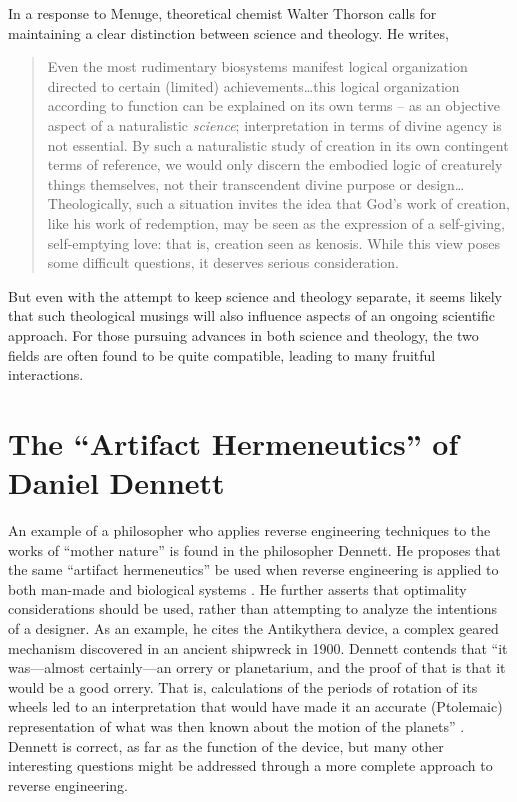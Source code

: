 In a response to Menuge, theoretical chemist Walter Thorson calls for
maintaining a clear distinction between science and theology. He
writes,

\begin{quote}
Even the most rudimentary biosystems manifest logical
organization directed to certain (limited) achievements{\ldots}this logical
organization according to function can be explained on its own terms –
as an objective aspect of a naturalistic \textit{science};
interpretation in terms of divine agency is not essential. By such a
naturalistic study of creation in its own contingent terms of
reference, we would only discern the embodied logic of creaturely
things themselves, not their transcendent divine purpose or
design{\ldots}Theologically, such a situation invites the idea that God’s work
of creation, like his work of redemption, may be seen as the expression
of a self-giving, self-emptying love: that is, creation seen as
kenosis. While this view poses some difficult questions, it deserves
serious consideration. \citep[][p.~101]{thorson2003} 
\end{quote}

But even with the attempt
to keep science and theology separate, it seems likely that such
theological musings will also influence aspects of an ongoing
scientific approach. For those pursuing advances in both science and
theology, the two fields are often found to be quite compatible,
leading to many fruitful interactions.

\section[Artifact Hermeneutics]{The “Artifact Hermeneutics” of Daniel Dennett}

An example of a philosopher who applies reverse engineering
techniques to the works of “mother nature” is found in the
philosopher Dennett. He proposes that the same ``artifact hermeneutics'' be used
when reverse engineering is applied to both man-made and biological
systems \citep[][p.~177]{dennett1990}. He further asserts that optimality
considerations should be used, rather than attempting to analyze the
intentions of a designer. As an example, he cites the Antikythera
device, a complex geared mechanism discovered in an ancient shipwreck
in 1900. Dennett contends that “it was---almost certainly---an orrery
or planetarium, and the proof of that is that it would be a good
orrery. That is, calculations of the periods of rotation of its wheels
led to an interpretation that would have made it an accurate
(Ptolemaic) representation of what was then known about the motion of
the planets” \citep[][p.~180]{dennett1990}. Dennett is correct, as far as the
function of the device, but many other interesting questions might be
addressed through a more complete approach to reverse engineering.

